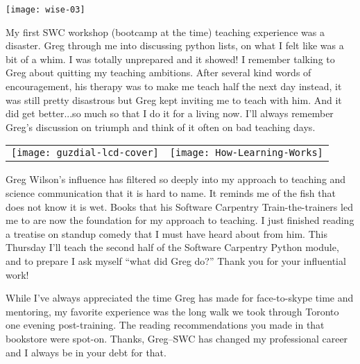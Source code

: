 \newpage
\begin{center}
\texttt{[image: wise-03]}
\end{center}

My first SWC workshop (bootcamp at the time) teaching experience was a
disaster.  Greg through me into discussing python lists, on what I felt like
was a bit of a whim.  I was totally unprepared and it showed!  I remember
talking to Greg about quitting my teaching ambitions.  After several kind words
of encouragement, his therapy was to make me teach half the next day instead,
it was still pretty disastrous but Greg kept inviting me to teach with him.
And it did get better...so much so that I do it for a living now.  I'll always
remember Greg's discussion on triumph and think of it often on bad teaching
days. 


\newpage
\vspace*{\fill}

\begin{center}
\begin{tabular*}{\textwidth}[t]{ c c }
    \texttt{[image: guzdial-lcd-cover]} &
    \texttt{[image: How-Learning-Works]} \\
\end{tabular*}
\end{center}

Greg Wilson's influence has filtered so deeply into my approach to teaching and
science communication that it is hard to name.  It reminds me of the fish that
does not know it is wet.  Books that his Software Carpentry Train-the-trainers
led me to are now the foundation for my approach to teaching.  I just finished
reading a treatise on standup comedy that I must have heard about from him.
This Thursday I'll teach the second half of the Software Carpentry Python
module, and to prepare I ask myself ``what did Greg do?'' Thank you for your
influential work!



While I've always appreciated the time Greg has made for face-to-skype time and
mentoring, my favorite experience was the long walk we took through Toronto one
evening post-training.  The reading recommendations you made in that bookstore
were spot-on.  Thanks, Greg--SWC has changed my professional career and I always
be in your debt for that.

